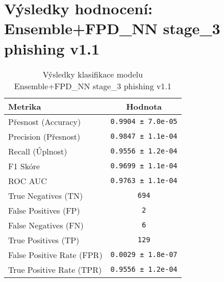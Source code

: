 \section*{Výsledky hodnocení: Ensemble+FPD_NN stage_3 phishing v1.1}
\begin{table}[h!]
\centering
\begin{tabular}{|l|c|}
\hline
\textbf{Metrika} & \textbf{Hodnota} \\
\hline
Přesnost (Accuracy) & \texttt{0.9904 ± 7.0e-05} \\
Precision (Přesnost) & \texttt{0.9847 ± 1.1e-04} \\
Recall (Úplnost) & \texttt{0.9556 ± 1.2e-04} \\
F1 Skóre & \texttt{0.9699 ± 1.1e-04} \\
ROC AUC & \texttt{0.9763 ± 1.1e-04} \\
True Negatives (TN) & \texttt{694} \\
False Positives (FP) & \texttt{2} \\
False Negatives (FN) & \texttt{6} \\
True Positives (TP) & \texttt{129} \\
False Positive Rate (FPR) & \texttt{0.0029 ± 1.8e-07} \\
True Positive Rate (TPR) & \texttt{0.9556 ± 1.2e-04} \\
\hline
\end{tabular}
\caption{Výsledky klasifikace modelu Ensemble+FPD_NN stage_3 phishing v1.1}
\label{tab:phishing_ensemble+fpd_nn}
\end{table}

